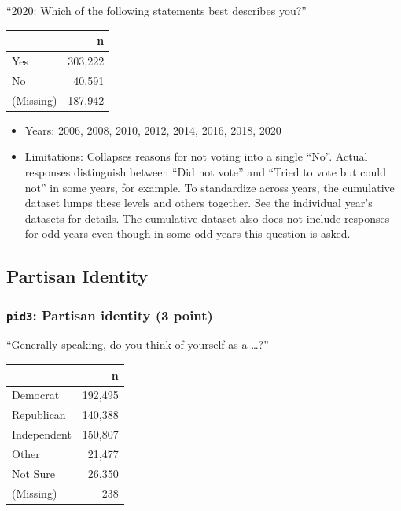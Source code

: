 \documentclass[10pt,article,oneside]{memoir}
\theoremstyle{definition}
\begin{document}
``2020: Which of the following statements best describes you?''

\begin{table}[H]
\centering
\begin{tabular}[t]{lr}
\toprule
 & n\\
\midrule
Yes & 303,222\\
No & 40,591\\
(Missing) & 187,942\\
\bottomrule
\end{tabular}
\end{table}

\begin{itemize}
\tightlist
\item
  Years: 2006, 2008, 2010, 2012, 2014, 2016, 2018, 2020
\item
  Limitations: Collapses reasons for not voting into a single ``No''.
  Actual responses distinguish between ``Did not vote'' and ``Tried to
  vote but could not'' in some years, for example. To standardize across
  years, the cumulative dataset lumps these levels and others together.
  See the individual year's datasets for details. The cumulative dataset
  also does not include responses for odd years even though in some odd
  years this question is asked.
\end{itemize}

\newpage

\hypertarget{partisan-identity}{%
\subsection{Partisan Identity}\label{partisan-identity}}

\hypertarget{pid3-partisan-identity-3-point}{%
\subsubsection{\texorpdfstring{\texttt{pid3}: Partisan identity (3
point)}{pid3: Partisan identity (3 point)}}\label{pid3-partisan-identity-3-point}}

``Generally speaking, do you think of yourself as a \ldots?''

\begin{table}[H]
\centering
\begin{tabular}[t]{lr}
\toprule
 & n\\
\midrule
Democrat & 192,495\\
Republican & 140,388\\
Independent & 150,807\\
Other & 21,477\\
Not Sure & 26,350\\
(Missing) & 238\\
\bottomrule
\end{tabular}
\end{table}
\end{document}
